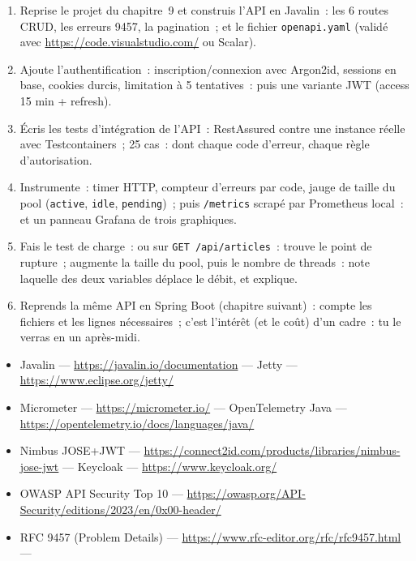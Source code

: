 \begin{exercice}
\begin{enumerate}
  \item Reprise le projet du chapitre~9 et construis l'API en Javalin~: les 6 routes CRUD, les
        erreurs 9457, la pagination~; et le fichier \verb|openapi.yaml| (valid\'e avec
        \url{https://code.visualstudio.com/} ou Scalar).
  \item Ajoute l'authentification~: inscription/connexion avec Argon2id, sessions en base,
        cookies durcis, limitation \`a 5 tentatives~: puis une variante JWT (access 15 min + refresh).
  \item \'Ecris les tests d'int\'egration de l'API~: RestAssured contre une instance r\'eelle avec
        Testcontainers~; 25 cas~: dont chaque code d'erreur, chaque r\`egle d'autorisation.
  \item Instrumente~: timer HTTP, compteur d'erreurs par code, jauge de taille du pool
        (\verb|active|, \verb|idle|, \verb|pending|)~; puis \verb|/metrics| scrap\'e par Prometheus
        local~: et un panneau Grafana de trois graphiques.
  \item Fais le test de charge~:  ou 
        sur \verb|GET /api/articles|~: trouve le point de rupture~; augmente la taille du pool,
        puis le nombre de threads~: note laquelle des deux variables d\'eplace le d\'ebit, et explique.
  \item Reprends la m\^eme API en Spring Boot (chapitre suivant)~: compte les fichiers et les lignes
        n\'ecessaires~; c'est l'int\'er\^et (et le co\^ut) d'un cadre~: tu le verras en un apr\`es-midi.
\end{enumerate}
\end{exercice}

\begin{ressources}
\begin{itemize}
  \item Javalin --- \url{https://javalin.io/documentation} --- Jetty --- \url{https://www.eclipse.org/jetty/}
  \item Micrometer --- \url{https://micrometer.io/} --- OpenTelemetry Java --- \url{https://opentelemetry.io/docs/languages/java/}
  \item Nimbus JOSE+JWT --- \url{https://connect2id.com/products/libraries/nimbus-jose-jwt} --- Keycloak --- \url{https://www.keycloak.org/}
  \item OWASP API Security Top 10 --- \url{https://owasp.org/API-Security/editions/2023/en/0x00-header/}
  \item RFC 9457 (Problem Details) --- \url{https://www.rfc-editor.org/rfc/rfc9457.html} --- 
\end{itemize}
\end{ressources}

